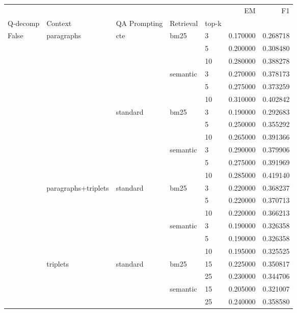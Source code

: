 \begin{tabular}{lllllrr}
\toprule
 &  &  &  &  & EM & F1 \\
Q-decomp & Context & QA Prompting & Retrieval & top-k &  &  \\
\midrule
\multirow[t]{22}{*}{False} & \multirow[t]{12}{*}{paragraphs} & \multirow[t]{6}{*}{cte} & \multirow[t]{3}{*}{bm25} & 3 & 0.170000 & 0.268718 \\
 &  &  &  & 5 & 0.200000 & 0.308480 \\
 &  &  &  & 10 & 0.280000 & 0.388278 \\
\cline{4-7}
 &  &  & \multirow[t]{3}{*}{semantic} & 3 & 0.270000 & 0.378173 \\
 &  &  &  & 5 & 0.275000 & 0.373259 \\
 &  &  &  & 10 & 0.310000 & 0.402842 \\
\cline{3-7} \cline{4-7}
 &  & \multirow[t]{6}{*}{standard} & \multirow[t]{3}{*}{bm25} & 3 & 0.190000 & 0.292683 \\
 &  &  &  & 5 & 0.250000 & 0.355292 \\
 &  &  &  & 10 & 0.265000 & 0.391366 \\
\cline{4-7}
 &  &  & \multirow[t]{3}{*}{semantic} & 3 & 0.290000 & 0.379906 \\
 &  &  &  & 5 & 0.275000 & 0.391969 \\
 &  &  &  & 10 & 0.285000 & 0.419140 \\
\cline{2-7} \cline{3-7} \cline{4-7}
 & \multirow[t]{6}{*}{paragraphs+triplets} & \multirow[t]{6}{*}{standard} & \multirow[t]{3}{*}{bm25} & 3 & 0.220000 & 0.368237 \\
 &  &  &  & 5 & 0.220000 & 0.370713 \\
 &  &  &  & 10 & 0.220000 & 0.366213 \\
\cline{4-7}
 &  &  & \multirow[t]{3}{*}{semantic} & 3 & 0.190000 & 0.326358 \\
 &  &  &  & 5 & 0.190000 & 0.326358 \\
 &  &  &  & 10 & 0.195000 & 0.325525 \\
\cline{2-7} \cline{3-7} \cline{4-7}
 & \multirow[t]{4}{*}{triplets} & \multirow[t]{4}{*}{standard} & \multirow[t]{2}{*}{bm25} & 15 & 0.225000 & 0.350817 \\
 &  &  &  & 25 & 0.230000 & 0.344706 \\
\cline{4-7}
 &  &  & \multirow[t]{2}{*}{semantic} & 15 & 0.205000 & 0.321007 \\
 &  &  &  & 25 & 0.240000 & 0.358580 \\
\cline{1-7} \cline{2-7} \cline{3-7} \cline{4-7}

\end{tabular}
